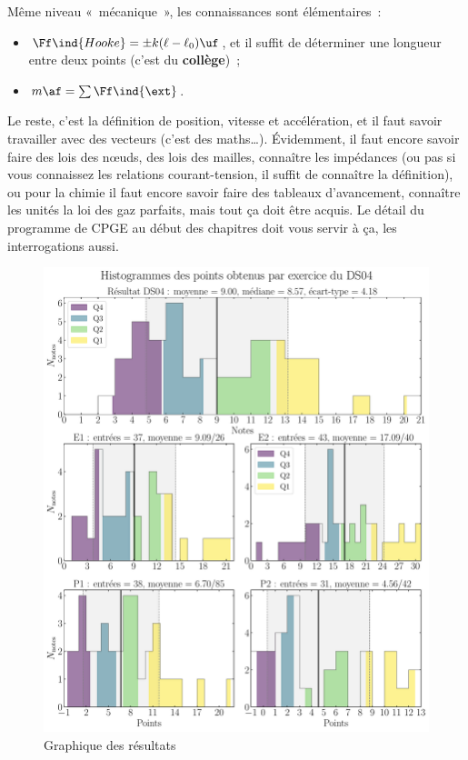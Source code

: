 \documentclass[a4paper, 12pt, final, garamond]{book}
\begin{document}
Même niveau «~mécanique~», les connaissances sont élémentaires~:
\begin{itemize}
	\item $\Ff\ind{Hooke} = \pm k (\ell-\ell_0)\uf$, et il suffit de déterminer
	      une longueur entre deux points (c'est du \textbf{collège})~;
	\item $m\af = \sum \Ff\ind{\ext}$.
\end{itemize}
Le reste, c'est la définition de position, vitesse et accélération, et il faut
savoir travailler avec des vecteurs (c'est des maths…).
\smallbreak
Évidemment, il faut encore savoir faire des lois des nœuds, des lois des
mailles, connaître les impédances (ou pas si vous connaissez les relations
courant-tension, il suffit de connaître la définition), ou pour la chimie il
faut encore savoir faire des tableaux d'avancement, connaître les unités la loi
des gaz parfaits, mais tout ça doit être acquis. Le détail du programme de CPGE
au début des chapitres doit vous servir à ça, les interrogations aussi.

\begin{figure}[htbp!]
	\centering
	\includegraphics[width=\linewidth]{DS04_hist_all}
	\caption{Graphique des résultats}
\end{figure}
\end{document}
